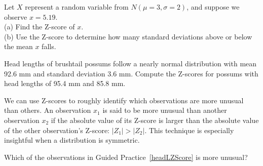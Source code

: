 \begin{exercisewrap}
\begin{nexercise}
Let $X$ represent a random variable from $N(\mu=3, \sigma=2)$,
and suppose we observe $x=5.19$. \\
(a)
    Find the Z-score of $x$. \\
(b)
    Use the Z-score to determine how many standard deviations
    above or below the mean $x$ falls.\footnotemark{}
\end{nexercise}
\end{exercisewrap}

\begin{exercisewrap}
\begin{nexercise} \label{headLZScore}
Head lengths of brushtail possums follow a nearly normal
distribution with mean 92.6 mm and standard deviation 3.6 mm.
Compute the Z-scores for possums with head lengths of 95.4 mm
and 85.8 mm.\footnotemark{}
\end{nexercise}
\end{exercisewrap}

We can use Z-scores to roughly identify which observations
are more unusual than others.
An observation $x_1$ is said to be more unusual than another
observation $x_2$ if the absolute value of its Z-score is larger
than the absolute value of the other observation's Z-score:
$|Z_1| > |Z_2|$.
This technique is especially insightful when a distribution
is symmetric.

\begin{exercisewrap}
\begin{nexercise}
Which of the observations in Guided Practice~\ref{headLZScore}
is more unusual?\footnotemark{}
\end{nexercise}
\end{exercisewrap}


